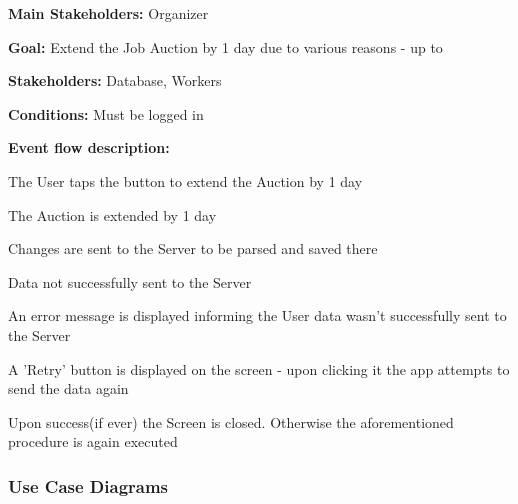 			\noindent {}
			\begin{packed_item}
				\item \textbf{Main Stakeholders:} Organizer
				\item \textbf{Goal:} Extend the Job Auction by 1 day due to various reasons - up to 
				\item \textbf{Stakeholders: } Database, Workers
				\item \textbf{Conditions: } Must be logged in
				\item \textbf{Event flow description: }
				\begin{packed_enum}
					\item The User taps the button to extend the Auction by 1 day
					\item The Auction is extended by 1 day
					\item Changes are sent to the Server to be parsed and saved there
				\end{packed_enum}
				
				\begin{packed_item}
					\item[3.a] Data not successfully sent to the Server
					\item[] \begin{packed_enum}
						\item An error message is displayed informing the User data wasn't successfully sent to the Server
						\item A 'Retry' button is displayed on the screen - upon clicking it the app attempts to send the data again
						\item Upon success(if ever) the Screen is closed. Otherwise the aforementioned procedure is again executed
					\end{packed_enum}
				\end{packed_item}
			\end{packed_item}
			
			\subsubsection{Use Case Diagrams}		
				
